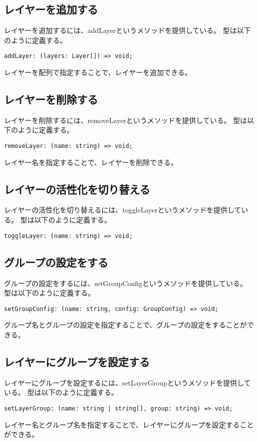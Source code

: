 \documentclass{jsarticle}
\begin{document}
\subsection{レイヤーを追加する}
レイヤーを追加するには、addLayerというメソッドを提供している。
型は以下のように定義する。
\begin{lstlisting}[caption=addLayerの型]
addLayer: (layers: Layer[]) => void;
\end{lstlisting}
レイヤーを配列で指定することで、レイヤーを追加できる。

\subsection{レイヤーを削除する}
レイヤーを削除するには、removeLayerというメソッドを提供している。
型は以下のように定義する。
\begin{lstlisting}[caption=removeLayerの型]
removeLayer: (name: string) => void;
\end{lstlisting}
レイヤー名を指定することで、レイヤーを削除できる。

\subsection{レイヤーの活性化を切り替える}
レイヤーの活性化を切り替えるには、toggleLayerというメソッドを提供している。
型は以下のように定義する。
\begin{lstlisting}[caption=toggleLayerの型]
toggleLayer: (name: string) => void;
\end{lstlisting}

\subsection{グループの設定をする}
グループの設定をするには、setGroupConfigというメソッドを提供している。
型は以下のように定義する。
\begin{lstlisting}[caption=setGroupConfigの型]
setGroupConfig: (name: string, config: GroupConfig) => void;
\end{lstlisting}
グループ名とグループの設定を指定することで、グループの設定をすることができる。

\subsection{レイヤーにグループを設定する}
レイヤーにグループを設定するには、setLayerGroupというメソッドを提供している。
型は以下のように定義する。
\begin{lstlisting}[caption=setLayerGroupの型]
setLayerGroup: (name: string | string[], group: string) => void;
\end{lstlisting}
レイヤー名とグループ名を指定することで、レイヤーにグループを設定することができる。
\end{document}
